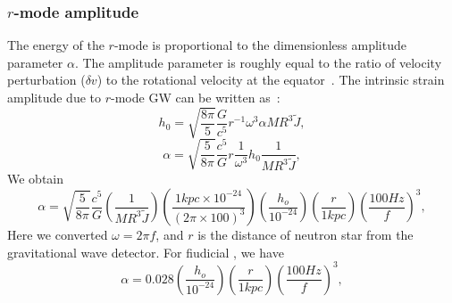 \documentclass{ttuthes2007}
\begin{document}
\subsubsection{$r$-mode amplitude}
The energy of the $r$-mode is proportional to the dimensionless amplitude
parameter $\alpha$. The amplitude parameter is roughly equal to the ratio of
velocity perturbation ($\delta v$) to the rotational velocity at the
equator~\cite{Ian}. The
intrinsic strain amplitude due to $r$-mode \ac{GW} can be written
as~\cite{Owen:2010ng}:
\begin{equation*}                                                               
h_0 =\sqrt{\frac{8\pi}{5}}\frac{G}{c^5}r^{-1}\omega^3 \alpha M R^3 \tilde{J},      
\end{equation*}                                                                 
\begin{equation*}                                                               
\alpha = \sqrt{\frac{5}{8\pi}}\frac{c^5}{G} r \frac{1}{\omega^3} h_0 \frac{1}{M   
R^3 \tilde{J}},                                                                  
\end{equation*}
We obtain                                                                 
\begin{equation*}                                                               
\alpha=\sqrt{\frac{5}{8\pi}}\frac{c^5}{G}\left(\frac{1}{M                       
R^3 \tilde{J}}\right)\left(\frac{1kpc\times 10^{-24}}{(2\pi \times
100)^3}\right)
\left(\frac{h_o}{10^{-24}}\right)\left(\frac{r}{1kpc}\right)\left(\frac{100Hz}{f}\right)^3,
\end{equation*}                                                                 
Here we converted $\omega=2\pi f$, and $r$ is the distance of neutron star from
the gravitational wave detector. For fiudicial , we have                         
\begin{equation} 
\alpha
=0.028\left(\frac{h_o}{10^{-24}}\right)\left(\frac{r}{1kpc}\right)\left(\frac{100Hz}{f}\right)^3,
\end{equation}           
\end{document}
